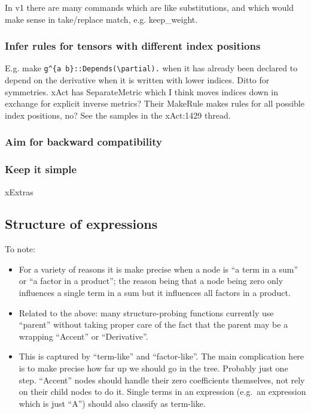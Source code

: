 \documentclass[11pt]{article}
\begin{document}
In v1 there are many commands which are like substitutions, and which
would make sense in take/replace match, e.g. keep\_weight. 

\subsubsection{Infer rules for tensors with different index positions}

E.g. make \verb|g^{a b}::Depends(\partial).| when it has already been
declared to depend on the derivative when it is written with lower
indices. Ditto for symmetries. xAct has SeparateMetric which I think
moves indices down in exchange for explicit inverse metrics? Their
MakeRule makes rules for all possible index positions, no? See the
samples in the xAct:1429 thread.



\subsubsection{Aim for backward compatibility}


\subsubsection{Keep it simple}


xExtras

\subsection{Structure of expressions}

To note:
\begin{itemize}
\item For a variety of reasons it is make precise when a node is ``a
  term in a sum'' or ``a factor in a product''; the reason being that
  a node being zero only influences a single term in a sum but it
  influences all factors in a product. 

\item Related to the above: many structure-probing functions currently
  use ``parent'' without taking proper care of the fact that the
  parent may be a wrapping ``Accent'' or ``Derivative''. 

\item This is captured by ``term-like'' and ``factor-like''. The main
  complication here is to make precise how far up we should go in the
  tree. Probably just one step. ``Accent'' nodes should handle their
  zero coefficients themselves, not rely on their child nodes to do
  it. Single terms in an expression (e.g.~an expression which is just
  ``A'') should also classify as term-like.
\end{itemize}
\end{document}
